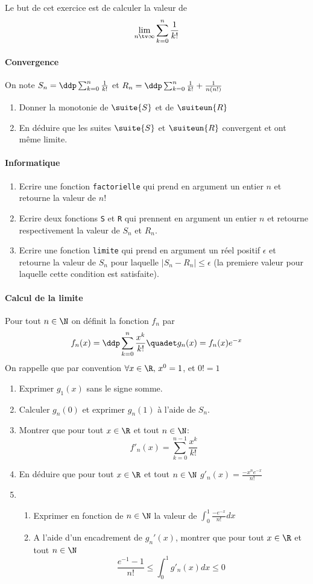 \documentclass[a4paper, 11pt,reqno]{article}
\begin{document}
\newpage
\begin{exercice}


Le but de cet exercice est de calculer la valeur de 
$$\lim_{n\tv \infty} \sum_{k=0}^n \frac{1}{k!}$$

\paragraph{Convergence}
On note $S_n=\ddp   \sum_{k=0}^n \frac{1}{k!}$ et $R_n=\ddp \sum_{k=0}^n \frac{1}{k!} +\frac{1}{n(n!)}$
\begin{enumerate}
\item Donner la monotonie de $\suite{S}$ et de $\suiteun{R}$
\item En déduire que les suites $\suite{S}$ et $\suiteun{R}$ convergent et ont même limite. 
\end{enumerate}

\paragraph{Informatique}
\begin{enumerate}
\item Ecrire une fonction \texttt{factorielle} qui prend en argument un entier $n$ et retourne la valeur de $n!$
\item Ecrire deux fonctions \texttt{S} et \texttt{R} qui prennent en argument un entier $n$ et retourne respectivement la valeur de $S_n$ et $R_n$. 
\item Ecrire une fonction \texttt{limite} qui prend en argument un réel positif $\epsilon$ et  retourne la valeur de $S_n$ pour laquelle $|S_n -R_n|\leq \epsilon$ (la premiere valeur pour laquelle cette condition est satisfaite).
\end{enumerate}


\paragraph{Calcul de la limite}
Pour tout $n\in \N$ on définit la fonction $f_n$ par 
$$f_n(x)  = \ddp \sum_{k=0}^n \frac{x^k}{k!} \quadet g_n(x) =f_n(x)e^{-x}$$
On rappelle que par convention $\forall x \in \R, \, x^0 =1$, et $0!=1$
\begin{enumerate}
\item Exprimer $g_1(x)$ sans le signe somme. 
\item Calculer $g_n(0)$ et exprimer $g_n(1)$ à l'aide de $S_n$. 
\item Montrer que pour tout $x\in \R$ et tout $n\in \N$: $$f'_n(x) = \sum_{k=0}^{n-1} \frac{x^k}{k!}$$
\item En déduire que  pour tout $x\in \R$ et tout $n\in \N$ $g'_n(x)= \frac{-x^ne^{-x}}{n!}$
\item  \begin{enumerate}
\item Exprimer en fonction de $n\in \N$ la valeur de  $\int_0^1 \frac{-e^{-x}}{n!}dx$
\item A l'aide d'un encadrement de $g_n'(x)$, montrer que pour tout $x\in \R$ et tout $n\in \N$ $$ \frac{e^{-1}-1}{n!}\leq \int_0^1 g'_n(x) dx\leq 0$$
\end{enumerate}



\end{enumerate}
\end{exercice}
\end{document}

